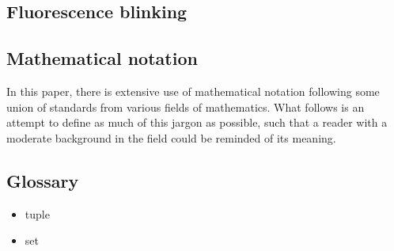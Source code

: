 \documentclass{article}
\newcommand{\braces}[1]{\ensuremath{\left\lbrace #1 \right\rbrace}}
\newcommand{\angles}[1]{\ensuremath{\left\langle #1 \right\rangle}}
\newcommand{\integers}{\ensuremath{\mathbb{Z}}}
\newcommand{\wholes}{\ensuremath{\mathbb{N}}}
\newcommand{\reals}{\ensuremath{\mathbb{R}}}
\renewcommand{\vec}{\mathbf}
\newcommand{\abs}[1]{\ensuremath{\left|#1\right|}}
\begin{document}
\subsection{Fluorescence blinking}

\appendixpage
\begin{appendix}
\section{Mathematical notation}
\label{sec:notation}
In this paper, there is extensive use of mathematical notation following some union of standards from various fields of mathematics. What follows is an attempt to define as much of this jargon as possible, such that a reader with a moderate background in the field could be reminded of its meaning.


\subsection{Glossary}
\begin{itemize}
\item tuple
\item set
\end{itemize}


\end{appendix}
\end{document}
